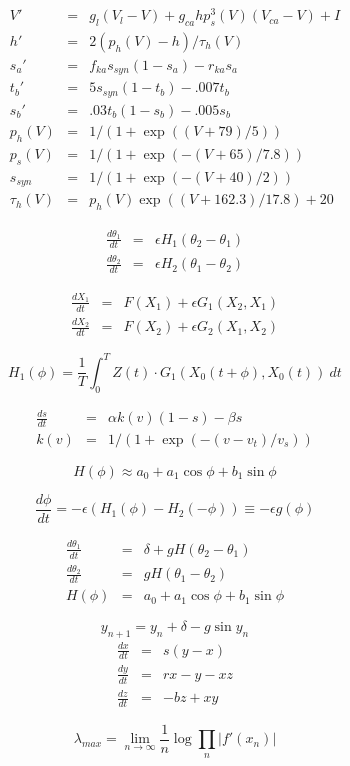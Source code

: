 \begin{eqnarray*}
V' &=&  g_l (V_l-V)+g_{ca}h p_s^3(V) (V_{ca}-V)+I\\
h' &=&  2(p_h(V)-h)/\tau_h(V) \\
s_a' &=&  f_{ka} s_{syn} (1-s_a)-r_{ka} s_a \\
t_b' &=&  5 s_{syn} (1-t_b)-.007 t_b \\
s_b' &=&  .03 t_b (1-s_b)-.005 s_b \\
p_h(V) &=& 1/(1+\exp((V+79)/5)) \\
p_s(V) &=&  1/(1+\exp(-(V+65)/7.8))\\
s_{syn} &=&  1/(1+\exp(-(V+40)/2))\\
\tau_h(V) &=& p_h(V)\exp((V+162.3)/17.8)+20
\end{eqnarray*}

\begin{eqnarray*}
\frac{d\theta_1}{dt} &=& \epsilon H_1(\theta_2-\theta_1) \\
\frac{d\theta_2}{dt} &=& \epsilon H_2(\theta_1-\theta_2)
\end{eqnarray*}

\begin{eqnarray*}
\frac{dX_1}{dt} &=& F(X_1)+\epsilon G_1(X_2,X_1) \\
\frac{dX_2}{dt} &=& F(X_2)+\epsilon G_2(X_1,X_2) 
\end{eqnarray*}

\[
H_1(\phi) = \frac{1}{T} \int_0^T Z(t)\cdot G_1(X_0(t+\phi),X_0(t))\ dt
\]

\begin{eqnarray*}
\frac{ds}{dt} &=& \alpha k(v)(1-s)-\beta s\\
k(v) &=& 1/(1+\exp(-(v-v_t)/v_s))
\end{eqnarray*}

\[
 H(\phi) \approx a_0 + a_1 \cos \phi + b_1 \sin \phi
\]

\[
\frac{d\phi}{dt} = -\epsilon(H_1(\phi)-H_2(-\phi))\equiv -\epsilon g(\phi)
\]

\begin{eqnarray*}
\frac{d\theta_1}{dt} &=& \delta+g H(\theta_2-\theta_1) \\
\frac{d\theta_2}{dt} &=&  gH(\theta_1-\theta_2) \\
H(\phi) &=& a_0 + a_1 \cos \phi + b_1 \sin \phi
\end{eqnarray*}

\[
 y_{n+1} = y_n + \delta - g \sin y_n
\]
\begin{eqnarray*}
\frac{dx}{dt} &=& s(y-x) \\
\frac{dy}{dt} &=& rx-y-xz \\
\frac{dz}{dt} &=& -bz+xy
\end{eqnarray*}

\[
 \lambda_{max} = \lim_{n\to\infty} \frac{1}{n}\log \prod_n |f'(x_n)|
\]
















